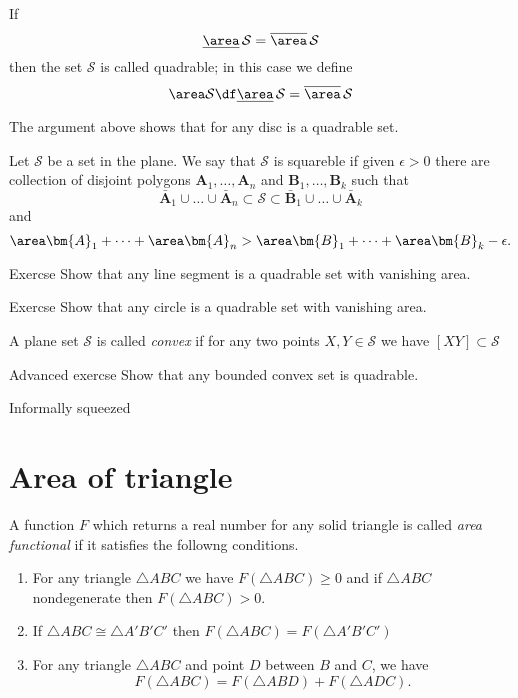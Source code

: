 {If
\[\underline\area\,\mathcal{S}=\overline\area\,\mathcal{S}\]
then the set $\mathcal{S}$ is called quadrable;
in this case we define 
\[\area\mathcal{S}\df\underline\area\,\mathcal{S}=\overline\area\,\mathcal{S}\]

The argument above shows that for any disc is a quadrable set.

Let $\mathcal S$ be a set in the plane.
We say that $\mathcal S$ is squareble if 
given $\epsilon>0$ there are collection of disjoint polygons $\bm{A}_1,\dots, \bm{A}_n$ and $\bm{B}_1,\dots, \bm{B}_k$
such that
\[\bar{\bm{A}}_1\cup\dots\cup\bar{\bm{A}}_n\subset\mathcal S\subset \bar{\bm{B}}_1\cup\dots\cup\bar{\bm{A}}_k\]
and 
\[\area\bm{A}_1+\dots+\area\bm{A}_n
>
\area\bm{B}_1+\dots+\area\bm{B}_k-\epsilon.\]

\begin{thm}{Exercse}
Show that any line segment is a quadrable set with vanishing area.
\end{thm}

\begin{thm}{Exercse}
Show that any circle is a quadrable set with vanishing area.
\end{thm}

A plane set $\mathcal{S}$
is called \emph{convex} if for any two points $X,Y\in \mathcal{S}$
we have $[XY]\subset \mathcal{S}$

\begin{thm}{Advanced exercse}
Show that any bounded convex set is quadrable.
\end{thm}



Informally squeezed


\section*{Area of triangle}


A function $F$ which returns a real number 
for any solid triangle is called \emph{area functional} if it satisfies the followng conditions.

\begin{enumerate}
\item For any triangle $\triangle ABC$ we have $F(\triangle ABC)\ge 0$ and 
if  $\triangle ABC$ nondegenerate then $F(\triangle ABC)>0$.
\item If $\triangle ABC\cong\triangle A'B'C'$ 
 then $F(\triangle ABC)=F(\triangle A'B'C')$
\item For any triangle $ \triangle ABC$ and point $D$ between $B$ and $C$, we have
$$F(\triangle ABC)=F(\triangle ABD)+F(\triangle ADC).$$
\end{enumerate}

}
